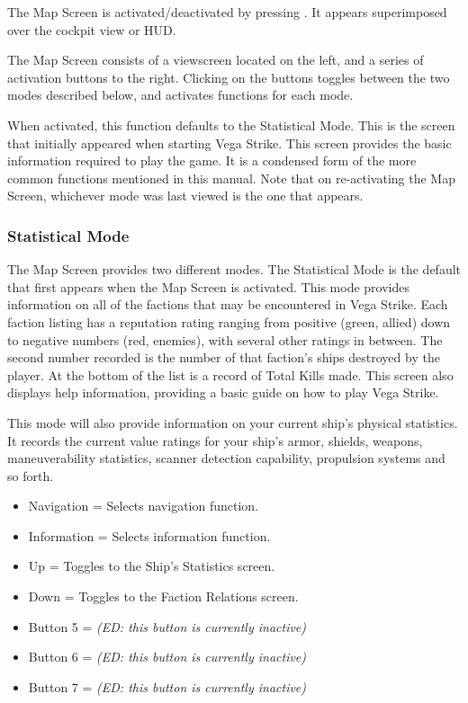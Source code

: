 \documentclass{article}
\newcommand{\key}[1]{%
  \tikz[baseline=(key.base)]{
    \node[draw=gray!50, fill=gray!5, rounded corners=2pt, inner sep=2pt, minimum height=1.5ex] (key) {\footnotesize\sffamily\bfseries #1};
  }%
}
\begin{document}
The Map Screen is activated/deactivated by pressing \key{M}. It appears superimposed over the cockpit view or HUD. 


The Map Screen consists of a viewscreen located on the left, and a series of activation buttons to the right. Clicking on the buttons toggles between the two modes described below, and activates functions for each mode. 


When activated, this function defaults to the Statistical Mode. This is the screen that initially appeared when starting Vega Strike. This screen provides the basic information required to play the game. It is a condensed form of the more common functions mentioned in this manual. Note that on re-activating the Map Screen, whichever mode was last viewed is the one that appears. 

\subsubsection{Statistical Mode }

The Map Screen provides two different modes. The Statistical Mode is the default that first appears when the Map Screen is activated. This mode provides information on all of the factions that may be encountered in Vega Strike. Each faction listing has a reputation rating ranging from positive (green, allied) down to negative numbers (red, enemies), with several other ratings in between. The second number recorded is the number of that faction's ships destroyed by the player. At the bottom of the list is a record of Total Kills made. This screen also displays help information, providing a basic guide on how to play Vega Strike. 


This mode will also provide information on your current ship's physical statistics. It records the current value ratings for your ship's armor, shields, weapons, maneuverability statistics, scanner detection capability, propulsion systems and so forth. 

\begin{itemize}
\item  Navigation = Selects navigation function. 

\item  Information = Selects information function. 

\item  Up = Toggles to the Ship's Statistics screen. 

\item  Down = Toggles to the Faction Relations screen. 

\item  Button 5 = \textit{(ED: this button is currently inactive) }

\item  Button 6 = \textit{(ED: this button is currently inactive) }

\item  Button 7 = \textit{(ED: this button is currently inactive) }
\end{itemize}
\end{document}
